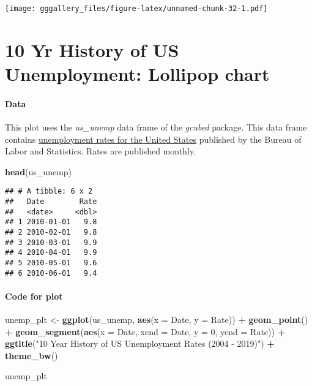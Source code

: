 \documentclass[]{book}
\newenvironment{Shaded}{\begin{snugshade}}{\end{snugshade}}
\newcommand{\DataTypeTok}[1]{\textcolor[rgb]{0.13,0.29,0.53}{#1}}
\newcommand{\DecValTok}[1]{\textcolor[rgb]{0.00,0.00,0.81}{#1}}
\newcommand{\KeywordTok}[1]{\textcolor[rgb]{0.13,0.29,0.53}{\textbf{#1}}}
\newcommand{\NormalTok}[1]{#1}
\newcommand{\OperatorTok}[1]{\textcolor[rgb]{0.81,0.36,0.00}{\textbf{#1}}}
\newcommand{\StringTok}[1]{\textcolor[rgb]{0.31,0.60,0.02}{#1}}
\begin{document}
\texttt{[image: gggallery\_files/figure-latex/unnamed-chunk-32-1.pdf]}

\hypertarget{unemppp}{%
\chapter*{10 Yr History of US Unemployment: Lollipop chart}\label{unemppp}}

\hypertarget{unempppdata}{%
\subsubsection*{Data}\label{unempppdata}}

This plot uses the \emph{us\_unemp} data frame of the \emph{gcubed} package. This data frame contains \href{https://data.bls.gov/timeseries/LNS14000000}{unemployment rates for the United States} published by the Bureau of Labor and Statistics. Rates are published monthly.

\begin{Shaded}
\begin{Highlighting}[]
\KeywordTok{head}\NormalTok{(us_unemp)}
\end{Highlighting}
\end{Shaded}

\begin{verbatim}
## # A tibble: 6 x 2
##   Date        Rate
##   <date>     <dbl>
## 1 2010-01-01   9.8
## 2 2010-02-01   9.8
## 3 2010-03-01   9.9
## 4 2010-04-01   9.9
## 5 2010-05-01   9.6
## 6 2010-06-01   9.4
\end{verbatim}

\hypertarget{unempppcode}{%
\subsubsection*{Code for plot}\label{unempppcode}}

\begin{Shaded}
\begin{Highlighting}[]
\NormalTok{unemp_plt <-}\StringTok{ }\KeywordTok{ggplot}\NormalTok{(us_unemp, }\KeywordTok{aes}\NormalTok{(}\DataTypeTok{x =}\NormalTok{ Date, }\DataTypeTok{y =}\NormalTok{ Rate)) }\OperatorTok{+}\StringTok{ }\KeywordTok{geom_point}\NormalTok{() }\OperatorTok{+}\StringTok{ }
\StringTok{  }\KeywordTok{geom_segment}\NormalTok{(}\KeywordTok{aes}\NormalTok{(}\DataTypeTok{x =}\NormalTok{ Date, }\DataTypeTok{xend =}\NormalTok{ Date, }\DataTypeTok{y =} \DecValTok{0}\NormalTok{, }\DataTypeTok{yend =}\NormalTok{ Rate)) }\OperatorTok{+}\StringTok{ }
\StringTok{  }\KeywordTok{ggtitle}\NormalTok{(}\StringTok{"10 Year History of US Unemployment Rates (2004 - 2019)"}\NormalTok{)  }\OperatorTok{+}
\StringTok{  }\KeywordTok{theme_bw}\NormalTok{()}


\NormalTok{unemp_plt}
\end{Highlighting}
\end{Shaded}
\end{document}
